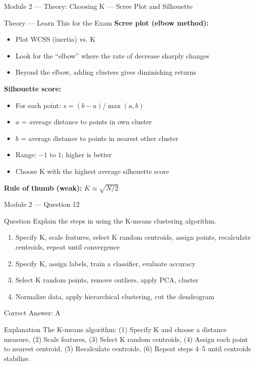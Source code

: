 \documentclass[aspectratio=169,10pt]{beamer}
\newcommand{\question}[1]{%
	\begin{block}{Question}
		#1
	\end{block}
}
\newcommand{\options}[4]{%
	\begin{enumerate}[label=\Alph*.,leftmargin=*]
		\item #1
		\item #2
		\item #3
		\item #4
	\end{enumerate}
}
\newcommand{\answerbox}[1]{%
	\begin{exampleblock}{Correct Answer: #1}
	\end{exampleblock}
}
\newcommand{\explain}[1]{%
	\begin{block}{Explanation}
		\small #1
	\end{block}
}
\newcommand{\theory}[1]{%
	\begin{block}{Theory --- Learn This for the Exam}
		\small #1
	\end{block}
}
\begin{document}
	\begin{frame}{Module 2 --- Theory: Choosing K --- Scree Plot and Silhouette}
		\theory{
			\textbf{Scree plot (elbow method):}
			\begin{itemize}
				\item Plot WCSS (inertia) vs. K
				\item Look for the ``elbow'' where the rate of decrease sharply changes
				\item Beyond the elbow, adding clusters gives diminishing returns
			\end{itemize}
			\textbf{Silhouette score:}
			\begin{itemize}
				\item For each point: $s = (b - a) / \max(a, b)$
				\item $a$ = average distance to points in own cluster
				\item $b$ = average distance to points in nearest other cluster
				\item Range: $-1$ to $1$; higher is better
				\item Choose K with the highest average silhouette score
			\end{itemize}
			\textbf{Rule of thumb (weak):} $K \approx \sqrt{N/2}$
		}
	\end{frame}
	
	\begin{frame}{Module 2 --- Question 12}
		\question{Explain the steps in using the K-means clustering algorithm.}
		\options{Specify K, scale features, select K random centroids, assign points, recalculate centroids, repeat until convergence}{Specify K, assign labels, train a classifier, evaluate accuracy}{Select K random points, remove outliers, apply PCA, cluster}{Normalize data, apply hierarchical clustering, cut the dendrogram}
		\answerbox{A}
		\explain{The K-means algorithm: (1) Specify K and choose a distance measure, (2) Scale features, (3) Select K random centroids, (4) Assign each point to nearest centroid, (5) Recalculate centroids, (6) Repeat steps 4--5 until centroids stabilize.}
	\end{frame}
	
\end{document}
